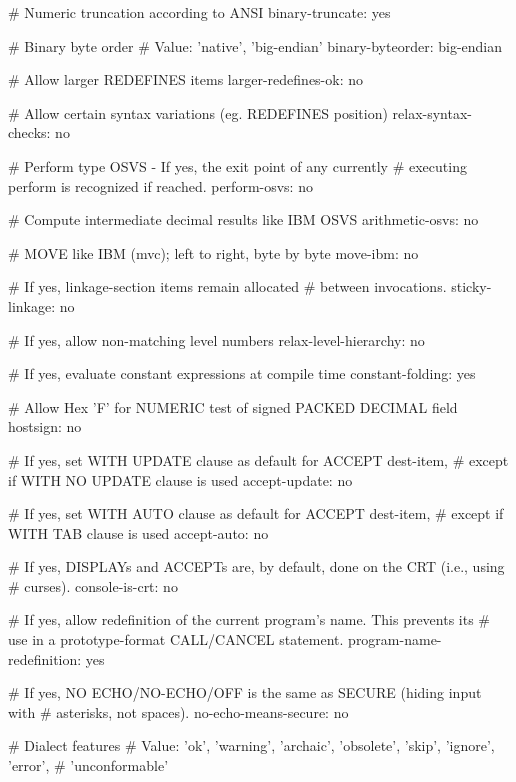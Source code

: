 # Numeric truncation according to ANSI
binary-truncate:		yes

# Binary byte order
# Value: 'native', 'big-endian'
binary-byteorder:		big-endian

# Allow larger REDEFINES items
larger-redefines-ok:		no

# Allow certain syntax variations (eg. REDEFINES position)
relax-syntax-checks:		no

# Perform type OSVS - If yes, the exit point of any currently
# executing perform is recognized if reached.
perform-osvs:			no

# Compute intermediate decimal results like IBM OSVS
arithmetic-osvs:		no

# MOVE like IBM (mvc); left to right, byte by byte
move-ibm:		no

# If yes, linkage-section items remain allocated
# between invocations.
sticky-linkage:			no

# If yes, allow non-matching level numbers
relax-level-hierarchy:		no

# If yes, evaluate constant expressions at compile time
constant-folding:		yes

# Allow Hex 'F' for NUMERIC test of signed PACKED DECIMAL field
hostsign:			no

# If yes, set WITH UPDATE clause as default for ACCEPT dest-item,
# except if WITH NO UPDATE clause is used
accept-update:			no

# If yes, set WITH AUTO clause as default for ACCEPT dest-item,
# except if WITH TAB clause is used
accept-auto:			no

# If yes, DISPLAYs and ACCEPTs are, by default, done on the CRT (i.e., using
# curses).
console-is-crt:			no

# If yes, allow redefinition of the current program's name. This prevents its
# use in a prototype-format CALL/CANCEL statement.
program-name-redefinition:	yes

# If yes, NO ECHO/NO-ECHO/OFF is the same as SECURE (hiding input with
# asterisks, not spaces).
no-echo-means-secure:		no

# Dialect features
# Value: 'ok', 'warning', 'archaic', 'obsolete', 'skip', 'ignore', 'error',
#        'unconformable'


